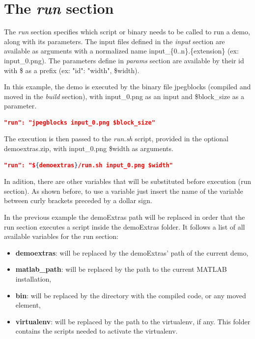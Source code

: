 \section{The \emph{run} section}

The \emph{run} section specifies which script or binary needs to be called to run a demo, along with its parameters. The input files defined in the \emph{input} section are available as arguments with a normalized name input\_\{0..n\}.\{extension\} (ex: input\_0.png). The parameters define in \emph{params} section are available by their id with \$ as a prefix (ex: "id": "width", \$width).

In this example, the demo is executed by the binary file jpegblocks (compiled and moved in the \emph{build} section), with input\_0.png as an input and \$block\_size as a parameter.
\begin{lstlisting}[language=json,firstnumber=1]
  "run": "jpegblocks input_0.png $block_size"\end{lstlisting}

The execution is then passed to the \emph{run.sh} script, provided in the optional demoextras.zip, with input\_0.png \$width as arguments.
\begin{lstlisting}[language=json,firstnumber=1]
  "run": "${demoextras}/run.sh input_0.png $width"
\end{lstlisting}

In adition, there are other variables that will be substituted before execution (run section). As shown before, to use a variable just insert the name of the variable between curly brackets preceded by a dollar sign.

In the previous example the demoExtras path will be replaced in order that the run section executes a script inside the demoExtras folder. It follows a list of all available variables for the run section:

\begin{itemize}
  \item \textbf{demoextras}: will be replaced by the demoExtras' path of the current demo,
  \item \textbf{matlab\_path}: will be replaced by the path to the current MATLAB installation,
  \item \textbf{bin}: will be replaced by the directory with the compiled code, or any moved element,
  \item \textbf{virtualenv}: will be replaced by the path to the virtualenv, if any. This folder contains the scripts needed to activate the virtualenv.
\end{itemize}


